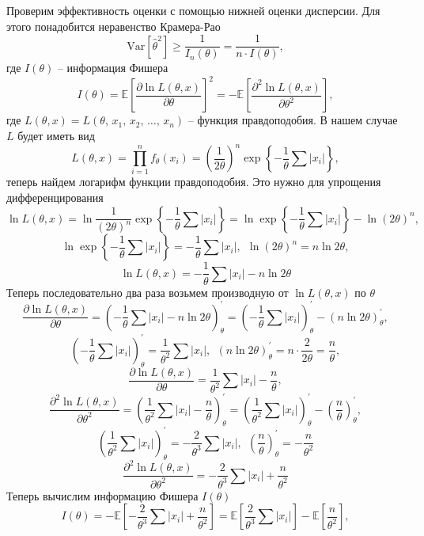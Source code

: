 \documentclass[a4paper, 12pt]{article}
\begin{document}
    Проверим эффективность оценки с помощью нижней оценки дисперсии. Для этого понадобится неравенство Крамера-Рао
    $$\text{Var}{\left[\hat{\theta}^2\right]}\geq\dfrac{1}{I_n(\theta)}=\dfrac{1}{n\cdot I(\theta)},$$
    где $I(\theta)$ -- информация Фишера
    $$I(\theta)=\mathbb{E}\left[\dfrac{\partial\ln{L\left(\theta,x\right)}}{\partial\theta}\right]^2=-\mathbb{E}\left[\dfrac{\partial^2\ln{L\left(\theta,x\right)}}{\partial\theta^2}\right],$$
    где $L\left(\theta,x\right)=L\left(\theta,\,x_1,\,x_2,\,\hdots,\,x_n\right)$ -- функция правдоподобия. В нашем случае $L$ будет иметь вид
    $$L\left(\theta,x\right)=\prod_{i=1}^nf_{\theta}\left(x_i\right)=\left(\dfrac{1}{2\theta}\right)^n\exp{\left\{-\dfrac{1}{\theta}\sum{|x_i|}\right\}},$$
    теперь найдем логарифм функции правдоподобия. Это нужно для упрощения дифференцирования
    $$\ln{L\left(\theta,x\right)}=\ln{\dfrac{1}{\left(2\theta\right)^n}}\exp{\left\{-\dfrac{1}{\theta}\sum{|x_i|}\right\}}=\ln{\exp{\left\{-\dfrac{1}{\theta}\sum{|x_i|}\right\}}}-\ln{\left(2\theta\right)^n},$$
    $$\ln{\exp{\left\{-\dfrac{1}{\theta}\sum{|x_i|}\right\}}}=-\dfrac{1}{\theta}\sum{|x_i|},\ \ \ln{\left(2\theta\right)^n}=n\ln{2\theta},$$
    $$\ln{L\left(\theta,x\right)}=-\dfrac{1}{\theta}\sum{|x_i|}-n\ln{2\theta}$$
    Теперь последовательно два раза возьмем производную от $\ln{L\left(\theta,x\right)}$ по $\theta$
    $$\dfrac{\partial\ln{L\left(\theta,x\right)}}{\partial\theta}=\left(-\dfrac{1}{\theta}\sum{|x_i|}-n\ln{2\theta}\right)^{\prime}_{\theta}=
    \left(-\dfrac{1}{\theta}\sum{|x_i|}\right)^{\prime}_{\theta}-\left(n\ln{2\theta}\right)^{\prime}_{\theta},$$
    $$\left(-\dfrac{1}{\theta}\sum{|x_i|}\right)^{\prime}_{\theta}=\dfrac{1}{\theta^2}\sum{|x_i|}, \ \ \left(n\ln{2\theta}\right)^{\prime}_{\theta}=n\cdot\dfrac{2}{2\theta}=\dfrac{n}{\theta},$$
    $$\dfrac{\partial\ln{L\left(\theta,x\right)}}{\partial\theta}=\dfrac{1}{\theta^2}\sum{|x_i|}-\dfrac{n}{\theta},$$
    $$\dfrac{\partial^2\ln{L\left(\theta,x\right)}}{\partial\theta^2}=\left(\dfrac{1}{\theta^2}\sum{|x_i|}-\dfrac{n}{\theta}\right)^{\prime}_{\theta}=
    \left(\dfrac{1}{\theta^2}\sum{|x_i|}\right)^{\prime}_{\theta}-\left(\dfrac{n}{\theta}\right)^{\prime}_{\theta},$$
    $$\left(\dfrac{1}{\theta^2}\sum{|x_i|}\right)^{\prime}_{\theta}=-\dfrac{2}{\theta^3}\sum{|x_i|}, \ \ \left(\dfrac{n}{\theta}\right)^{\prime}_{\theta}=-\dfrac{n}{\theta^2}$$
    $$\dfrac{\partial^2\ln{L\left(\theta,x\right)}}{\partial\theta^2}=-\dfrac{2}{\theta^3}\sum{|x_i|}+\dfrac{n}{\theta^2}$$
    Теперь вычислим информацию Фишера $I\left(\theta\right)$
    $$I\left(\theta\right)=-\mathbb{E}\left[-\dfrac{2}{\theta^3}\sum{|x_i|}+\dfrac{n}{\theta^2}\right]=\mathbb{E}\left[\dfrac{2}{\theta^3}\sum{|x_i|}\right]-\mathbb{E}\left[\dfrac{n}{\theta^2}\right],$$
\end{document}
